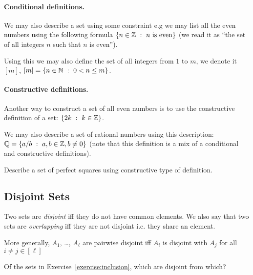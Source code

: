 \paragraph{Conditional definitions.}
We may also describe a set using some constraint e.g we may list all the even
numbers using the following formula $\set[n \text{ is even}]{n \in \Z}$
(we read it as ``the set of all integers $n$ such that $n$ is even'').

Using this we may also define the set of all integers from $1$ to $m$, we
denote it $[m]$, $[m] = \set[0 < n \le m]{n \in \N}$.


\paragraph{Constructive definitions.} Another way to construct a set of all
even numbers is to use the constructive definition of a set:
$\set[k \in \Z]{2k}$.

We may also describe a set of rational numbers using this description:
$\Q = \set[a, b \in \Z, b \neq 0]{a / b}$ (note that this definition is a mix of
a conditional and constructive definitions).

\begin{exercise}
  Describe a set of perfect squares using constructive type of definition.
\end{exercise}

\subsection{Disjoint Sets}
Two sets are \textit{disjoint} iff they do not have common elements. We also
say that two sets are \textit{overlapping} iff they are not disjoint i.e. they
share an element.

More generally, $A_1$, \dots, $A_\ell$ are pairwise disjoint iff $A_i$ is
disjoint with $A_j$ for all $i \neq j \in [\ell]$

\begin{exercise}
  Of the sets in Exercise~\ref{exercise:inclusion}, which are disjoint from
  which?
\end{exercise}


